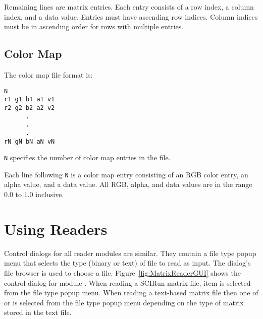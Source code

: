 Remaining lines are matrix entries.  Each entry consists of a row
index, a column index, and a data value.  Entries must have ascending
row indices. Column indices must be in ascending order for rows with
multiple entries.

\subsection{Color Map}
\label{sec:colormap_fmt}

The color map file format is:

\begin{verbatim}
N
r1 g1 b1 a1 v1
r2 g2 b2 a2 v2
      .
      .
      .
rN gN bN aN vN
\end{verbatim}


\verb|N| specifies the number of color map entries in the file.

Each line following \verb|N| is a color map entry consisting of an RGB
color entry, an alpha value, and a data value.  All RGB, alpha, and
data values are in the range 0.0 to 1.0 inclusive.


\section{Using Readers}
\label{sec:using_readers}

\newcommand{\MatrixReaderGUI}{%
  \includegraphics[0,0][485,252]{Figures/MatrixReaderGUI-small.eps.gz}
}
\begin{htmlonly}
  \newcommand{\MatrixReaderGUI}{%
    \htmladdimg[alt="MatrixReader Dialog"]{../Figures/MatrixReaderGUI.gif}
  }
\end{htmlonly}

\newcommand{\ReadFieldNet}{%
  \includegraphics[0,0][358,227]{Figures/ReadFieldNet.eps.gz}
}
\begin{htmlonly}
  \newcommand{\ReadFieldNet}{%
    \htmladdimg[alt="Network that reads a text-based field"]{../Figures/ReadFieldNet.gif}
  }
\end{htmlonly}

Control dialogs for all reader modules are similar.  They contain a
file type popup menu that selects the type (binary or text) of file to
read as input.  The dialog's file browser is used to choose a file.
Figure~\ref{fig:MatrixReaderGUI} shows the control dialog for module
.  When reading a SCIRun matrix file, item
 is selected from the file
type popup menu.  When reading a text-based matrix file then one of
 or
 is selected from the file type
popup menu depending on the type of matrix stored in the text file.

